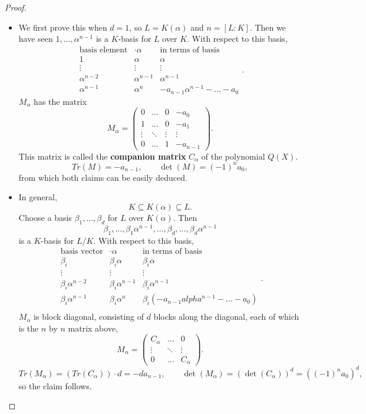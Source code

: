 \documentclass{article}
\newcommand{\rb}[1]{\left( #1 \right)}
\renewcommand{\sb}[1]{\left[ #1 \right]}
\theoremstyle{definition}\newtheorem{definition}{Definition}[subsection]
\theoremstyle{definition}\newtheorem{remark}[definition]{Remark}
\theoremstyle{definition}\newtheorem*{example}{Example}
\theoremstyle{definition}\newtheorem*{note}{Note}
\begin{document}
\begin{proof}
\hfill
\begin{itemize}
\item We first prove this when $ d = 1 $, so $ L = K\rb{\alpha} $ and $ n = \sb{L : K} $. Then we have seen $ 1, \dots, \alpha^{n - 1} $ is a $ K $-basis for $ L $ over $ K $. With respect to this basis,
$$
\begin{array}{c|c|c}
\text{basis element} & \cdot \alpha & \text{in terms of basis} \\
\hline
1 & \alpha & \alpha \\
\vdots & \vdots & \vdots \\
\alpha^{n - 2} & \alpha^{n - 1} & \alpha^{n - 1} \\
\alpha^{n - 1} & \alpha^n & -a_{n - 1}\alpha^{n - 1} - \dots - a_0
\end{array}.
$$
$ M_\alpha $ has the matrix
$$ M_\alpha = \begin{pmatrix}
0 & \dots & 0 & -a_0 \\
1 & \dots & 0 & -a_1 \\
\vdots & \ddots & \vdots & \vdots \\
0 & \dots & 1 & -a_{n - 1}
\end{pmatrix}. $$
This matrix is called the \textbf{companion matrix} $ C_\alpha $ of the polynomial $ Q\rb{X} $.
$$ Tr\rb{M} = -a_{n - 1}, \qquad \det\rb{M} = \rb{-1}^na_0, $$
from which both claims can be easily deduced.
\item In general,
$$ K \subseteq K\rb{\alpha} \subseteq L. $$
Choose a basis $ \beta_1, \dots, \beta_d $ for $ L $ over $ K\rb{\alpha} $. Then
$$ \beta_1, \dots, \beta_1\alpha^{n - 1}, \dots, \beta_d, \dots, \beta_d\alpha^{n - 1} $$
is a $ K $-basis for $ L / K $. With respect to this basis,
$$
\begin{array}{c|c|c}
\text{basis vector} & \cdot \alpha & \text{in terms of basis} \\
\hline
\beta_i & \beta_i\alpha & \beta_i\alpha \\
\vdots & \vdots & \vdots \\
\beta_i\alpha^{n - 2} & \beta_i\alpha^{n - 1} & \beta_i\alpha^{n - 1} \\
\beta_i\alpha^{n - 1} & \beta_i\alpha^n & \beta_i\rb{-a_{n - 1}alpha^{n - 1} - \dots - a_0} \\
\end{array}.
$$
$ M_\alpha $ is block diagonal, consisting of $ d $ blocks along the diagonal, each of which is the $ n $ by $ n $ matrix above,
$$ M_\alpha = \begin{pmatrix}
C_\alpha & \dots & 0 \\
\vdots & \ddots & \vdots \\
0 & \dots & C_\alpha
\end{pmatrix}. $$
$$ Tr\rb{M_\alpha} = \rb{Tr\rb{C_\alpha}} \cdot d = -da_{n - 1}, \qquad \det\rb{M_\alpha} = \rb{\det\rb{C_\alpha}}^d = \rb{\rb{-1}^na_0}^d, $$
so the claim follows.
\end{itemize}
\end{proof}
\end{document}
